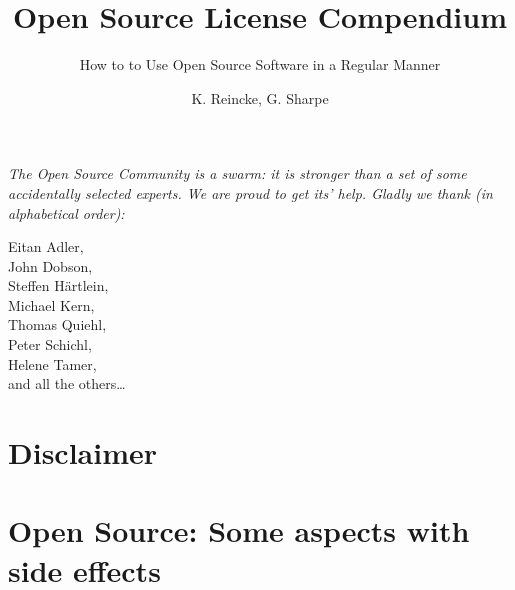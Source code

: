 \documentclass[DIV=calc,BCOR=5mm,12pt,headings=small,oneside,toc=bib]{scrbook}
\begin{document}

\titlehead{Release }
\subject{\small \itshape A Practical Guide for Developers, Managers, Companies,
and OS Experts}
\title{Open Source License Compendium}
\subtitle{How to to Use Open Source Software in a Regular Manner}
\author{K. Reincke, G. Sharpe }
\maketitle

\footnotesize
\begin{flushright} 

\parbox{100mm}{\itshape
The Open Source Community is a swarm: it is stronger than a set of some
accidentally selected experts. We are proud to get its' help. Gladly we thank
(in alphabetical order):
}

\parbox{50mm}{
\tiny
\begin{flushright}
Eitan Adler,\\
John Dobson, \\
Steffen Härtlein, \\
Michael Kern,\\
Thomas Quiehl,\\
Peter Schichl,\\
Helene Tamer,\\
and all the others\ldots
\end{flushright}
}
\end{flushright}
\normalsize
\newpage

\footnotesize
\tableofcontents
\newpage

\normalsize

\chapter*{Disclaimer}



%




\chapter{Open Source: Some aspects with side effects}\label{sec:SideEffects}






\end{document}

